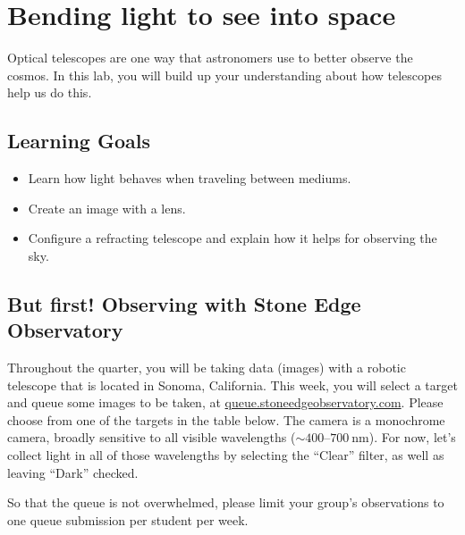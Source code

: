 \chapter{Bending light to see into space}

Optical telescopes are one way that astronomers use to better observe the cosmos. In this lab, you will build up your understanding about how telescopes help us do this.

\section{Learning Goals}

\begin{itemize}
	\item Learn how light behaves when traveling between mediums.
	
	\item Create an image with a lens.
	
	\item Configure a refracting telescope and explain how it helps for observing the sky.
\end{itemize}

\section{But first! Observing with Stone Edge Observatory}

Throughout the quarter, you will be taking data (images) with a robotic telescope that is located in Sonoma, California. This week, you will select a target and queue some images to be taken, at \url{queue.stoneedgeobservatory.com}. Please choose from one of the targets in the table below. The camera is a monochrome camera, broadly sensitive to all visible wavelengths ($\sim 400$--$700\:$nm). For now, let's collect light in all of those wavelengths by selecting the ``Clear'' filter, as well as leaving ``Dark'' checked.

So that the queue is not overwhelmed, please limit your group's observations to one queue submission per student per week.

